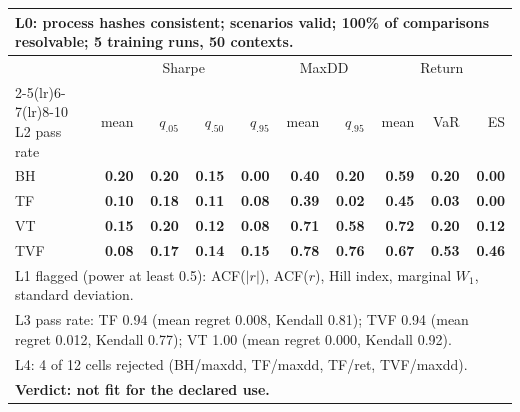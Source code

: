 \begin{tabular}{lrrrrrrrrr}
\toprule
\multicolumn{10}{p{13.5cm}}{L0: process hashes consistent; scenarios valid; 100\% of comparisons resolvable; 5 training runs, 50 contexts.} \\
\midrule
 & \multicolumn{4}{c}{Sharpe} & \multicolumn{2}{c}{MaxDD} & \multicolumn{3}{c}{Return} \\
\cmidrule(lr){2-5}\cmidrule(lr){6-7}\cmidrule(lr){8-10}
L2 pass rate & mean & $q_{.05}$ & $q_{.50}$ & $q_{.95}$ & mean & $q_{.95}$ & mean & VaR & ES \\
\midrule
BH & \textbf{0.20} & \textbf{0.20} & \textbf{0.15} & \textbf{0.00} & \textbf{0.40} & \textbf{0.20} & \textbf{0.59} & \textbf{0.20} & \textbf{0.00} \\
TF & \textbf{0.10} & \textbf{0.18} & \textbf{0.11} & \textbf{0.08} & \textbf{0.39} & \textbf{0.02} & \textbf{0.45} & \textbf{0.03} & \textbf{0.00} \\
VT & \textbf{0.15} & \textbf{0.20} & \textbf{0.12} & \textbf{0.08} & \textbf{0.71} & \textbf{0.58} & \textbf{0.72} & \textbf{0.20} & \textbf{0.12} \\
TVF & \textbf{0.08} & \textbf{0.17} & \textbf{0.14} & \textbf{0.15} & \textbf{0.78} & \textbf{0.76} & \textbf{0.67} & \textbf{0.53} & \textbf{0.46} \\
\midrule
\multicolumn{10}{p{13.5cm}}{L1 flagged (power at least 0.5): ACF($|r|$), ACF($r$), Hill index, marginal $W_1$, standard deviation.} \\
\multicolumn{10}{p{13.5cm}}{L3 pass rate: TF 0.94 (mean regret 0.008, Kendall 0.81); TVF 0.94 (mean regret 0.012, Kendall 0.77); VT 1.00 (mean regret 0.000, Kendall 0.92).} \\
\multicolumn{10}{p{13.5cm}}{L4: 4 of 12 cells rejected (BH/maxdd, TF/maxdd, TF/ret, TVF/maxdd).} \\
\multicolumn{10}{p{13.5cm}}{\textbf{Verdict: not fit for the declared use.}} \\
\bottomrule
\end{tabular}

